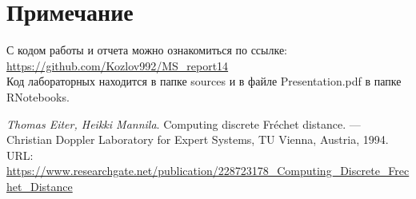 \documentclass[a4paper]{article}
\begin{document}
\section*{Примечание}
С кодом работы и отчета можно ознакомиться по ссылке:\\\url{https://github.com/Kozlov992/MS_report14}\\
Код лабораторных находится в папке sources и в файле Presentation.pdf в папке RNotebooks.
\begin{thebibliography}{9}
\textit{Thomas Eiter, Heikki Mannila}. Computing discrete Fréchet distance. — Christian Doppler Laboratory for Expert Systems, TU Vienna, Austria, 1994.  URL: \url{https://www.researchgate.net/publication/228723178_Computing_Discrete_Frechet_Distance}
\end{thebibliography}
\end{document}
